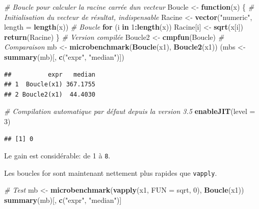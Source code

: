 \documentclass[
  12pt,
  french,
  a4paper,
  extrafontsizes,onecolumn,openright
  ]{memoir}
\newenvironment{Shaded}{\begin{snugshade}}{\end{snugshade}}
\newcommand{\AttributeTok}[1]{\textcolor[rgb]{0.13,0.29,0.53}{#1}}
\newcommand{\CommentTok}[1]{\textcolor[rgb]{0.56,0.35,0.01}{\textit{#1}}}
\newcommand{\ControlFlowTok}[1]{\textcolor[rgb]{0.13,0.29,0.53}{\textbf{#1}}}
\newcommand{\DecValTok}[1]{\textcolor[rgb]{0.00,0.00,0.81}{#1}}
\newcommand{\FunctionTok}[1]{\textcolor[rgb]{0.13,0.29,0.53}{\textbf{#1}}}
\newcommand{\NormalTok}[1]{#1}
\newcommand{\OtherTok}[1]{\textcolor[rgb]{0.56,0.35,0.01}{#1}}
\newcommand{\SpecialCharTok}[1]{\textcolor[rgb]{0.81,0.36,0.00}{\textbf{#1}}}
\newcommand{\StringTok}[1]{\textcolor[rgb]{0.31,0.60,0.02}{#1}}
\begin{document}
\begin{Shaded}
\begin{Highlighting}[]
\CommentTok{\# Boucle pour calculer la racine carrée d\textquotesingle{}un vecteur}
\NormalTok{Boucle }\OtherTok{\textless{}{-}} \ControlFlowTok{function}\NormalTok{(x) \{}
  \CommentTok{\# Initialisation du vecteur de résultat, indispensable}
\NormalTok{  Racine }\OtherTok{\textless{}{-}} \FunctionTok{vector}\NormalTok{(}\StringTok{"numeric"}\NormalTok{, }\AttributeTok{length =} \FunctionTok{length}\NormalTok{(x))}
  \CommentTok{\# Boucle}
  \ControlFlowTok{for}\NormalTok{ (i }\ControlFlowTok{in} \DecValTok{1}\SpecialCharTok{:}\FunctionTok{length}\NormalTok{(x)) Racine[i] }\OtherTok{\textless{}{-}} \FunctionTok{sqrt}\NormalTok{(x[i])}
  \FunctionTok{return}\NormalTok{(Racine)}
\NormalTok{\}}
\CommentTok{\# Version compilée}
\NormalTok{Boucle2 }\OtherTok{\textless{}{-}} \FunctionTok{cmpfun}\NormalTok{(Boucle)}
\CommentTok{\# Comparaison}
\NormalTok{mb }\OtherTok{\textless{}{-}} \FunctionTok{microbenchmark}\NormalTok{(}\FunctionTok{Boucle}\NormalTok{(x1), }\FunctionTok{Boucle2}\NormalTok{(x1))}
\NormalTok{(mbs }\OtherTok{\textless{}{-}} \FunctionTok{summary}\NormalTok{(mb)[, }\FunctionTok{c}\NormalTok{(}\StringTok{"expr"}\NormalTok{, }\StringTok{"median"}\NormalTok{)])}
\end{Highlighting}
\end{Shaded}

\begin{verbatim}
##          expr   median
## 1  Boucle(x1) 367.1755
## 2 Boucle2(x1)  44.4030
\end{verbatim}

\begin{Shaded}
\begin{Highlighting}[]
\CommentTok{\# Compilation automatique par défaut depuis la version 3.5}
\FunctionTok{enableJIT}\NormalTok{(}\AttributeTok{level =} \DecValTok{3}\NormalTok{)}
\end{Highlighting}
\end{Shaded}

\begin{verbatim}
## [1] 0
\end{verbatim}

\normalsize

Le gain est considérable: de 1 à \texttt{8}.

Les boucles for sont maintenant nettement plus rapides que \texttt{vapply}.

\scriptsize

\begin{Shaded}
\begin{Highlighting}[]
\CommentTok{\# Test}
\NormalTok{mb }\OtherTok{\textless{}{-}} \FunctionTok{microbenchmark}\NormalTok{(}\FunctionTok{vapply}\NormalTok{(x1, }\AttributeTok{FUN =}\NormalTok{ sqrt, }\DecValTok{0}\NormalTok{), }\FunctionTok{Boucle}\NormalTok{(x1))}
\FunctionTok{summary}\NormalTok{(mb)[, }\FunctionTok{c}\NormalTok{(}\StringTok{"expr"}\NormalTok{, }\StringTok{"median"}\NormalTok{)]}
\end{Highlighting}
\end{Shaded}
\end{document}
